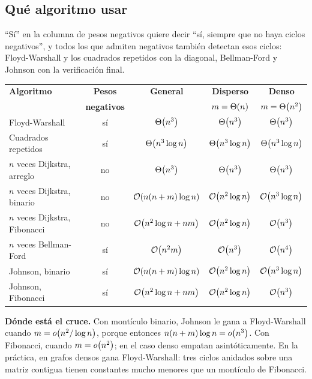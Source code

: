 \documentclass[11pt,letterpaper]{article}
\begin{document}

\subsection*{Qué algoritmo usar}

``Sí'' en la columna de pesos negativos quiere decir ``sí, siempre que
no haya ciclos negativos'', y todos los que admiten negativos también
detectan esos ciclos: Floyd-Warshall y los cuadrados repetidos con la
diagonal, Bellman-Ford y Johnson con la verificación final.

\begin{center}
\small
\begin{tabular}{lcccc}
  \toprule
  \textbf{Algoritmo} & \textbf{Pesos} & \textbf{General}
    & \textbf{Disperso} & \textbf{Denso} \\
  & \textbf{negativos} & & $m = \Theta\!\left(n\right)$ & $m = \Theta\!\left(n^2\right)$ \\
  \midrule
  Floyd-Warshall & sí & $\Theta\!\left(n^3\right)$ & $\Theta\!\left(n^3\right)$ & $\Theta\!\left(n^3\right)$ \\
  Cuadrados repetidos & sí & $\Theta\!\left(n^3 \log n\right)$ & $\Theta\!\left(n^3 \log n\right)$
    & $\Theta\!\left(n^3 \log n\right)$ \\
  \addlinespace
  $n$ veces Dijkstra, arreglo & no & $\Theta\!\left(n^3\right)$ & $\Theta\!\left(n^3\right)$
    & $\Theta\!\left(n^3\right)$ \\
  $n$ veces Dijkstra, binario & no & $\mathcal{O}\!\left(n(n + m)\log n\right)$
    & $\mathcal{O}\!\left(n^2 \log n\right)$ & $\mathcal{O}\!\left(n^3 \log n\right)$ \\
  $n$ veces Dijkstra, Fibonacci & no & $\mathcal{O}\!\left(n^2 \log n + nm\right)$
    & $\mathcal{O}\!\left(n^2 \log n\right)$ & $\mathcal{O}\!\left(n^3\right)$ \\
  \addlinespace
  $n$ veces Bellman-Ford & sí & $\mathcal{O}\!\left(n^2 m\right)$ & $\mathcal{O}\!\left(n^3\right)$
    & $\mathcal{O}\!\left(n^4\right)$ \\
  \addlinespace
  Johnson, binario & sí & $\mathcal{O}\!\left(n(n + m)\log n\right)$ & $\mathcal{O}\!\left(n^2 \log n\right)$
    & $\mathcal{O}\!\left(n^3 \log n\right)$ \\
  Johnson, Fibonacci & sí & $\mathcal{O}\!\left(n^2 \log n + nm\right)$
    & $\mathcal{O}\!\left(n^2 \log n\right)$ & $\mathcal{O}\!\left(n^3\right)$ \\
  \bottomrule
\end{tabular}
\end{center}

\textbf{Dónde está el cruce.} Con montículo binario, Johnson le gana a
Floyd-Warshall cuando $m = o\!\left(n^2 / \log n\right)$, porque entonces
$n(n + m)\log n = o\!\left(n^3\right)$. Con Fibonacci, cuando $m = o\!\left(n^2\right)$; en
el caso denso empatan asintóticamente. En la práctica, en grafos
densos gana Floyd-Warshall: tres ciclos anidados sobre una matriz
contigua tienen constantes mucho menores que un montículo de
Fibonacci.
\end{document}
